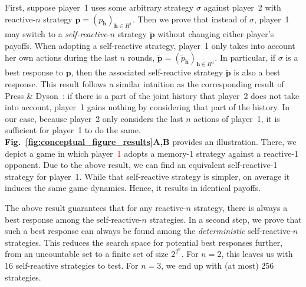 \documentclass[11pt]{article}
\newcommand{\figref}[1]{{\textbf{Fig.~\ref{#1}}}}
\begin{document}
First, suppose player~1 uses some arbitrary strategy $\sigma$ against player~2 with reactive-$n$ strategy \mbox{$\mathbf{p}\!=\!(p_\mathbf{h})_{\mathbf{h}\in H^1}$}. 
Then we prove that instead of $\sigma$, player~1 may switch to a {\it self-reactive}-$n$ strategy $\mathbf{\tilde{p}}$ without changing either player's payoffs. 
When adopting a self-reactive strategy, player~1 only takes into account her own actions during the last $n$ rounds, 
$\mathbf{\tilde{p}} \!=\! (\tilde{p}_\mathbf{h})_{\mathbf{h} \in H^1}$.
In particular, if $\sigma$ is a best response to $\mathbf{p}$, then the associated self-reactive strategy $\mathbf{\tilde p}$ is also a best response. 
This result follows a similar intuition as the corresponding result of Press \& Dyson~\cite{press:PNAS:2012}: 
if there is a part of the joint history that player~2 does not take into account, player~1 gains nothing by considering that part of the history. 
In our case, because player~2 only considers the last $n$ actions of player~1, it is sufficient for player~1 to do the same.
\figref{fig:conceptual_figure_results}\textbf{A,B} provides an illustration.  
There, we depict a game in which player~\textcolor{red}{1} %
adopts a memory-1 strategy against a reactive-1 opponent. 
Due to the above result, we can find an equivalent self-reactive-1 strategy for player~1. 
While that self-reactive strategy is simpler, on average it induces the same game dynamics. 
Hence, it results in identical payoffs. 

The above result guarantees that for any reactive-$n$ strategy, there is always a best response among the self-reactive-$n$ strategies. 
In a second step, we prove that such a best response can always be found among the {\it deterministic} self-reactive-$n$ strategies. 
This reduces the search space for potential best responses further, from an uncountable set to a finite set of size $2^{2^n}$. 
For $n\!=\!2$, this leaves us with 16 self-reactive strategies to test. 
For $n\!=\!3$, we end up with (at most) 256 strategies.\\


\end{document}
